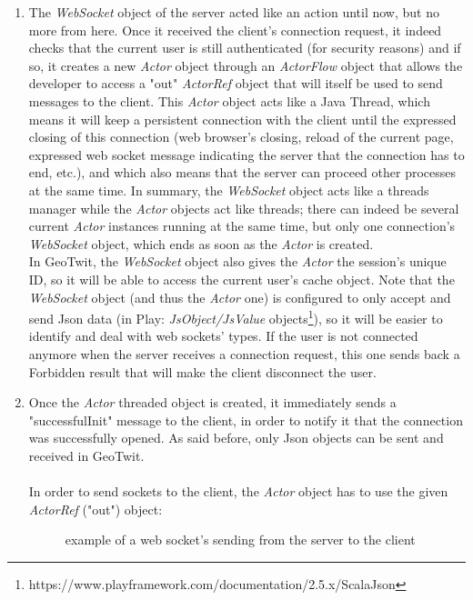 \documentclass[a4paper,11pt]{report}
\begin{document}
\begin{enumerate}
	\item The \emph{WebSocket} object of the server acted like an action until now, but no more from here. Once it received the client's connection request, it indeed checks that the current user is still authenticated (for security reasons) and if so, it creates a new \emph{Actor} object through an \emph{ActorFlow} object that allows the developer to access a "out" \emph{ActorRef} object that will itself be used to send messages to the client. This \emph{Actor} object acts like a Java Thread, which means it will keep a persistent connection with the client until the expressed closing of this connection (web browser's closing, reload of the current page, expressed web socket message indicating the server that the connection has to end, etc.), and which also means that the server can proceed other processes at the same time. In summary, the \emph{WebSocket} object acts like a threads manager while the \emph{Actor} objects act like threads; there can indeed be several current \emph{Actor} instances running at the same time, but only one connection's \emph{WebSocket} object, which ends as soon as the \emph{Actor} is created.\\
	In GeoTwit, the \emph{WebSocket} object also gives the \emph{Actor} the session's unique ID, so it will be able to access the current user's cache object. Note that the \emph{WebSocket} object (and thus the \emph{Actor} one) is configured to only accept and send Json data (in Play: \emph{JsObject/JsValue} objects\footnote{https://www.playframework.com/documentation/2.5.x/ScalaJson}), so it will be easier to identify and deal with web sockets' types. If the user is not connected anymore when the server receives a connection request, this one sends back a Forbidden result that will make the client disconnect the user.
	\item Once the \emph{Actor} threaded object is created, it immediately sends a "successfulInit" message to the client, in order to notify it that the connection was successfully opened. As said before, only Json objects can be sent and received in GeoTwit.\\\\
	In order to send sockets to the client, the \emph{Actor} object has to use the given \emph{ActorRef} ("out") object:
	\begin{figure}[H]
	\vspace{-5pt}
	\begin{center}
	\vspace{-5pt}
	\caption{example of a web socket's sending from the server to the client}
	\end{center}
	\end{figure}
	\vspace{-20pt}
	

\end{enumerate}
\end{document}
